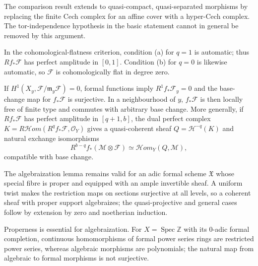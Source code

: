 \begin{remark}\label{fga-rem-8-3-5}
The comparison result extends to quasi-compact, quasi-separated morphisms by
replacing the finite Cech complex for an affine cover with a hyper-Cech complex.
The tor-independence hypothesis in the basic statement cannot in general be
removed by this argument.
\end{remark}

\begin{remark}\label{fga-rem-8-3-11-1}\uses{}
In the cohomological-flatness criterion, condition (a) for $q=1$ is automatic;
thus $Rf_*\mathcal F$ has perfect amplitude in $[0,1]$.  Condition (b) for
$q=0$ is likewise automatic, so $\mathcal F$ is cohomologically flat in degree
zero.
\end{remark}

\begin{remark}\label{fga-rem-8-3-11-2}
If $H^1(X_y,\mathcal F/\mathfrak m_y\mathcal F)=0$, formal functions imply
$R^1f_*\mathcal F_y=0$ and the base-change map for $f_*\mathcal F$ is
surjective.  In a neighbourhood of $y$, $f_*\mathcal F$ is then locally free
of finite type and commutes with arbitrary base change.  More generally, if
$Rf_*\mathcal F$ has perfect amplitude in $[q+1,b]$, the dual perfect complex
$K=R\mathcal Hom(R^qf_*\mathcal F,\mathcal O_Y)$ gives a quasi-coherent sheaf
$Q=\mathcal H^{-q}(K)$ and natural exchange isomorphisms
\[
R^{b-q}f_*(\mathcal M\otimes\mathcal F)\simeq
\mathcal Hom_Y(Q,\mathcal M),
\]
compatible with base change.
\end{remark}

\begin{remark}\label{fga-rem-8-4-3-2}
The algebraization lemma remains valid for an adic formal scheme $\mathfrak X$
whose special fibre is proper and equipped with an ample invertible sheaf.  A
uniform twist makes the restriction maps on sections surjective at all levels,
so a coherent sheaf with proper support algebraizes; the quasi-projective and
general cases follow by extension by zero and noetherian induction.
\end{remark}

\begin{remark}\label{fga-rem-8-4-8}
Properness is essential for algebraization.  For $X=\operatorname{Spec}\mathbb Z$
with its $0$-adic formal completion, continuous homomorphisms of formal power
series rings are restricted power series, whereas algebraic morphisms are
polynomials; the natural map from algebraic to formal morphisms is not
surjective.
\end{remark}


